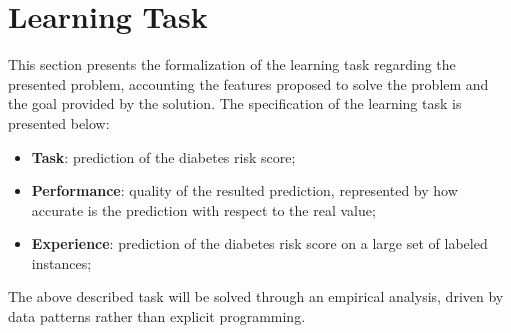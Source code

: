 \documentclass[a4paper]{article}
\providecommand{\keywords}[1]
{
  \small	
  \textbf{\textit{Keywords---}} #1
}
\begin{document}
\section{Learning Task}

\par This section presents the formalization of the learning task regarding the presented problem, accounting the features proposed to solve the problem and the goal provided by the solution. The specification of the learning task is presented below:

\begin{itemize}
	\item \textbf{Task}: prediction of the diabetes risk score;
	\item \textbf{Performance}: quality of the resulted prediction, represented by how accurate is the prediction with respect to the real value;
	\item \textbf{Experience}: prediction of the diabetes risk score on a large set of labeled instances;
\end{itemize}

\par The above described task will be solved through an empirical analysis, driven by data patterns rather than explicit programming.


%
%
\end{document}
